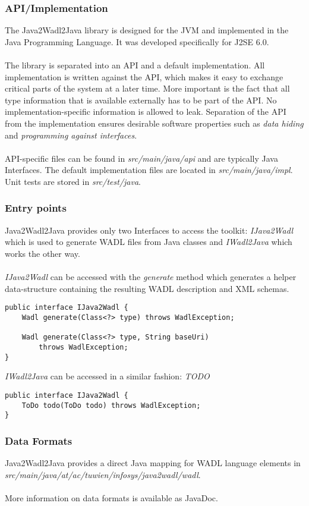 \subsubsection*{API/Implementation}
The Java2Wadl2Java library is designed for the JVM and implemented in the Java Programming Language. It was developed specifically for J2SE 6.0.
\\ \\
The library is separated into an API and a default implementation. All implementation is written against the API, which makes it easy to exchange critical parts of the system at a later time. More important is the fact that all type information that is available externally has to be part of the API. No implementation-specific information is allowed to leak. Separation of the API from the implementation ensures desirable software properties such as \emph{data hiding} and \emph{programming against interfaces}.
\\ \\
API-specific files can be found in \emph{src/main/java/api} and are typically Java Interfaces. The default implementation files are located in \emph{src/main/java/impl}. Unit tests are stored in \emph{src/test/java}.

\subsubsection*{Entry points}
Java2Wadl2Java provides only two Interfaces to access the toolkit: \emph{IJava2Wadl} which is used to generate WADL files from Java classes and \emph{IWadl2Java} which works the other way.
\\ \\
\emph{IJava2Wadl} can be accessed with the \emph{generate} method which generates a helper data-structure containing the resulting WADL description and XML schemas.
\lstset{language=Java, numbers=left, frame=single, tabsize=2, caption=The IJava2Wadl Interface, label=IJava2Wadl}
\begin{lstlisting}
public interface IJava2Wadl {
	Wadl generate(Class<?> type) throws WadlException;
	
	Wadl generate(Class<?> type, String baseUri) 
		throws WadlException;
}

\end{lstlisting}
\emph{IWadl2Java} can be accessed in a similar fashion: \emph{TODO}
\lstset{language=Java, numbers=left, frame=single, tabsize=2, caption=The IWadl2Java Interface, label=IWadl2Java}
\begin{lstlisting}
public interface IJava2Wadl {
	ToDo todo(ToDo todo) throws WadlException;
}
\end{lstlisting}

\subsubsection*{Data Formats}
Java2Wadl2Java provides a direct Java mapping for WADL language elements in \emph{src/main/java/at/ac/tuwien/infosys/java2wadl/wadl}. 
\\ \\
More information on data formats is available as JavaDoc.